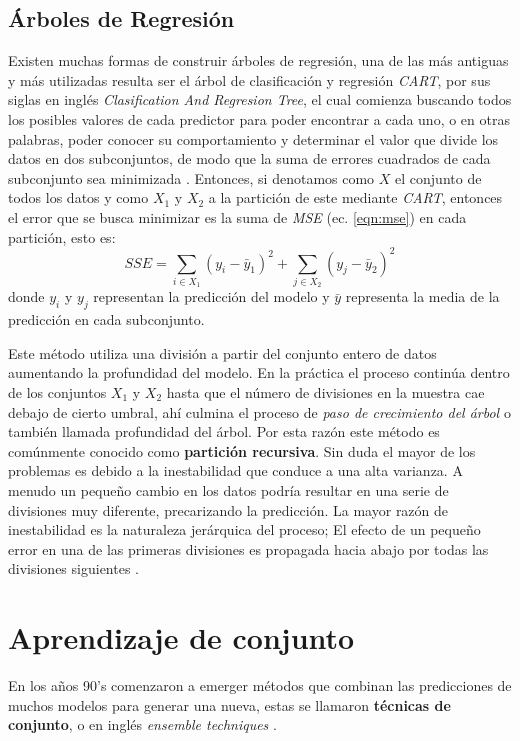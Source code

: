     \subsection{Árboles de Regresión}
    Existen muchas formas de construir árboles de regresión, una de las más antiguas y más utilizadas
    resulta ser el árbol de clasificación y regresión \textit{CART}, por sus siglas en inglés 
    \textit{Clasification And Regresion Tree}, el cual comienza buscando todos los posibles valores de cada predictor para poder encontrar a cada uno,
    o en otras palabras, poder conocer su comportamiento y determinar el valor que divide los datos en dos subconjuntos, de modo que la suma de errores 
    cuadrados de cada subconjunto sea minimizada \cite{18}. Entonces, si denotamos como $X$ el conjunto de todos los datos y como $X_1 \text{ y } X_2$ a la
    partición de este mediante \textit{CART}, entonces el error que se busca minimizar es la suma de \textit{MSE} (ec. \ref{eqn:mse}) en cada partición, esto es:
    \begin{equation*} 
        SSE = \sum_{i\in X_1}(y_i-\bar{y}_1)^2+ \sum_{j\in X_2}(y_j-\bar{y}_2)^2
    \end{equation*}
    donde $y_i$ y $y_j$ representan la predicción del modelo y $\bar{y}$ representa la media de la predicción en cada subconjunto.

    Este método utiliza una división a partir del conjunto entero de datos aumentando la profundidad del modelo. En la práctica el proceso continúa
    dentro de los conjuntos $X_1$ y $X_2$ hasta que el número de divisiones en la muestra cae debajo de cierto umbral, ahí culmina el proceso de
    \textit{paso de crecimiento del árbol} \cite{18} o también llamada profundidad del árbol.
    Por esta razón este método es comúnmente conocido como \textbf{partición recursiva}. Sin duda el mayor de los problemas es debido a la inestabilidad que conduce a una alta varianza. 
    A menudo un pequeño cambio en los datos podría resultar en una serie de divisiones muy diferente, precarizando la predicción. La mayor razón de inestabilidad es la naturaleza 
    jerárquica del proceso; El efecto de un pequeño error en una de las primeras divisiones es propagada hacia abajo por todas las divisiones siguientes \cite{13}.
%
%
%
%
\section{Aprendizaje de conjunto}
En los años 90's comenzaron a emerger métodos que combinan las predicciones de muchos modelos para generar una nueva, estas se llamaron \textbf{técnicas de conjunto},
o en inglés \textit{ensemble techniques} \cite{18}.

